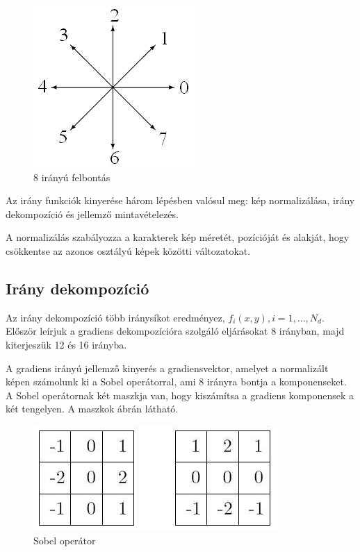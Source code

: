 \begin{figure}[h]
\centering
\includegraphics[scale=0.5]{images/direction8}
\caption{8 irányú felbontás}
\label{fig:direction8}
\end{figure}

Az irány funkciók kinyerése három lépésben valósul meg: kép normalizálása, irány dekompozíció és jellemző mintavételezés. 

A normalizálás szabályozza a karakterek kép méretét, pozícióját és alakját, hogy csökkentse az azonos osztályú képek közötti változatokat.

\subsection{Irány dekompozíció}

Az irány dekompozíció több iránysíkot eredményez, $f_i(x, y), i = 1,. . . , N_d$. Először leírjuk a gradiens dekompozícióra szolgáló eljárásokat 8 irányban, majd kiterjeszük 12 és 16 irányba.

A gradiens irányú jellemző kinyerés a gradiensvektor, amelyet a normalizált képen számolunk ki a Sobel operátorral, ami 8 irányra bontja a komponenseket. A Sobel operátornak két maszkja van, hogy kiszámítsa a gradiens komponensek a két tengelyen. A maszkok  ábrán látható.

\begin{figure}[h]
\centering
\includegraphics[scale=0.5]{images/sobel_operator}
\caption{Sobel operátor}
\label{fig:sobel_operator}
\end{figure}

